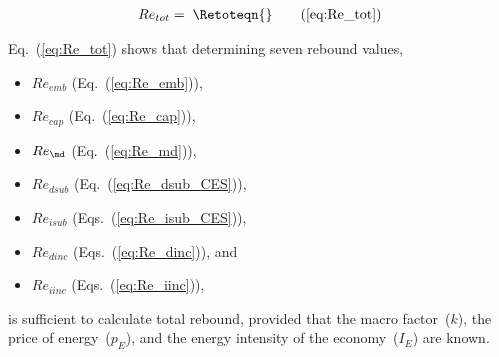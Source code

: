 \begin{align}
  Re_{tot} = \; \Retoteqn{} \tag{\ref{eq:Re_tot}}
\end{align}

Eq.~(\ref{eq:Re_tot}) shows that determining seven rebound values,

\begin{itemize}

  \item $Re_{emb}$ (Eq.~(\ref{eq:Re_emb})), 

  \item $Re_{cap}$ (Eq.~(\ref{eq:Re_cap})), 
  
  \item $Re_{\md}$ (Eq.~(\ref{eq:Re_md})),
  
  \item $Re_{dsub}$ (Eq.~(\ref{eq:Re_dsub_CES})),
  
  \item $Re_{isub}$ (Eqs.~(\ref{eq:Re_isub_CES})), 
  
  \item $Re_{dinc}$ (Eqs.~(\ref{eq:Re_dinc})), and
  
  \item $Re_{iinc}$ (Eqs.~(\ref{eq:Re_iinc})),

\end{itemize}
%
is sufficient to calculate total rebound, 
provided that 
the macro factor~($k$),
the price of energy~($p_E$), and
the energy intensity of the economy~($I_E$) 
are known.
